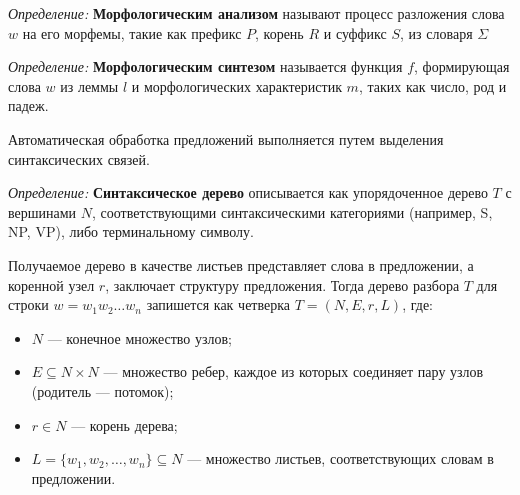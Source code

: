 \textit{Определение:} \textbf{Морфологическим анализом} называют процесс разложения 
слова $w$ на его морфемы, такие как префикс $P$, корень $R$ и суффикс $S$, из словаря $\Sigma$

\textit{Определение:} \textbf{Морфологическим синтезом} называется функция $f$,
формирующая слова $w$ из леммы $l$ и морфологических характеристик $m$, таких как 
число, род и падеж.

Автоматическая обработка предложений выполняется путем выделения синтаксических связей.

\textit{Определение:} \textbf{Синтаксическое дерево} описывается как упорядоченное дерево $T$ с вершинами $N$, соответствующими
синтаксическими категориями (например, S, NP, VP), либо терминальному символу.

Получаемое дерево в качестве листьев представляет слова в предложении, а коренной узел $r$, заключает структуру предложения. 
Тогда дерево разбора $T$ для строки $w = w_1 w_2 \ldots w_n$ запишется как четверка $T = (N, E, r, L)$, где: 
\begin{itemize}
    \item $N$ --- конечное множество узлов;
    \item $E \subseteq N \times N$ --- множество ребер, каждое из которых соединяет пару узлов (родитель — потомок);
    \item  $r \in N$ --- корень дерева;
    \item $L = \{ w_1, w_2, \ldots, w_n \} \subseteq N$ --- множество листьев, соответствующих словам в предложении.
\end{itemize}